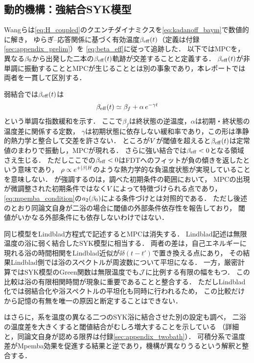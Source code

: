 \documentclass[a4paper,11pt,onecolumn,baselineskip=14.5pt]{jlreq}
\begin{document}
\subsection{動的機構：強結合SYK模型}
\label{sec:results_wang}

Wangら\cite{Wang2024}は\eqref{eq:H_coupled}のクエンチダイナミクスを\eqref{eq:kadanoff_baym}で数値的に解き，
ゆらぎ--応答関係に基づく有効温度$\beta_{\mathrm{eff}}(t)$（定義は付録\ref{sec:appendix_prelim}）を
\eqref{eq:beta_eff}に従って追跡した．
以下ではMPCを，異なる$\beta_{0}$から出発した二本の$\beta_{\mathrm{eff}}(t)$軌跡が交差することと定義する．
$\beta_{\mathrm{eff}}(t)$が非単調に振動することとMPCが生じることとは別の事象であり，本レポートでは両者を一貫して区別する．

弱結合では$\beta_{\mathrm{eff}}(t)$は
\begin{equation}
  \beta_{\mathrm{eff}}(t) \simeq \beta_f + \alpha\,e^{-\gamma t}
  \label{eq:slow_relaxation}
\end{equation}
という単調な指数緩和を示す\cite{Eberlein2017}．
ここで$\beta_f$は終状態の逆温度，$\alpha$は初期・終状態の温度差に関係する定数，
$\gamma$は初期状態に依存しない緩和率であり，この形は準静的熱力学と整合して交差を許さない．
ところが$V$が閾値を超えると$\beta_{\mathrm{eff}}(t)$は定常値のまわりで振動し，MPCが現れる．
さらに強い結合では$\beta_{\mathrm{eff}}<0$となる領域さえ生じる．
ただしここでの$\beta_{\mathrm{eff}}<0$はFDTへのフィットが負の傾きを返したという意味であり，
$\rho\propto e^{+\abs{\beta}H}$のような熱力学的な負温度状態が実現していることを意味しない．
\cite{Wang2024}が強調するのは，調べた初期条件の範囲において，
MPCの出現が微調整された初期条件ではなく$V$によって特徴づけられる点であり，
\eqref{eq:mpemba_condition}の$a_{2}(\beta_{0})$による条件づけとは対照的である．
ただし後述のとおり同論文自身が二浴の場合に閾値の外部条件依存性を報告しており，
閾値がいかなる外部条件にも依存しないわけではない．

同じ模型をLindblad方程式で記述するとMPCは消失する．
Lindblad記述は無限温度の浴に弱く結合したSYK模型に相当する．
両者の差は，自己エネルギーに現れる浴の時間相関をLindblad近似が$\ii\delta(t-t')$で置き換える点にあり，
その結果Lindblad側では浴のスペクトルが周波数について平坦になる．
一方，厳密計算ではSYK模型のGreen関数は無限温度でも$\mathcal{J}$に比例する有限の幅をもつ\cite{Wang2024}．
この比較は浴の有限相関時間が現象に重要であることと整合する．
ただしLindblad化では弱結合化や浴スペクトルの平坦化も同時に行われるため，
この比較だけから記憶の有無を唯一の原因と断定することはできない．

\cite{Wang2024}はさらに，系を温度の異なる二つのSYK浴に結合させた別の設定も調べ，
二浴の温度差を大きくすると閾値結合がむしろ増大することを示している
（詳細と，同論文自身が認める限界は付録\ref{sec:appendix_twobath}）．
可積分系で温度差がMpemba効果を促進する結果\cite{WangWang2024}と逆であり，機構が異なりうるという解釈と整合する．
\end{document}
